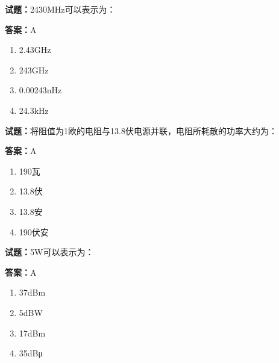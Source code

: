 \documentclass{ctexbook}
\begin{document}




\vspace{1em}

\textbf{试题：}2430MHz可以表示为： 

\textbf{答案：}A 

\begin{enumerate}[leftmargin=3em]
  \item 2.43GHz 

  \item 243GHz 

  \item 0.00243nHz 

  \item 24.3kHz 

\end{enumerate}





\vspace{1em}

\textbf{试题：}将阻值为1欧的电阻与13.8伏电源并联，电阻所耗散的功率大约为： 

\textbf{答案：}A 

\begin{enumerate}[leftmargin=3em]
  \item 190瓦 

  \item 13.8伏 

  \item 13.8安 

  \item 190伏安 

\end{enumerate}





\vspace{1em}

\textbf{试题：}5W可以表示为： 

\textbf{答案：}A 

\begin{enumerate}[leftmargin=3em]
  \item 37dBm 

  \item 5dBW 

  \item 17dBm 

  \item 35dBμ 

\end{enumerate}
\end{document}
